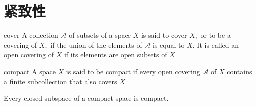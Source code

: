 \chapter{紧致性}
\begin{definition}{cover}
A collection $\mathcal{A}$ of subsets of a space $X$ is said to cover $X,$ or to be a covering of $X,$ if the union of the elements of $\mathcal{A}$ is equal to $X .$ It is called an open covering of $X$ if its elements are open subsets of $X$
\end{definition}
\begin{definition}{compact}
A space $X$ is said to be compact if every open covering $\mathcal{A}$ of $X$ contains a finite subcollection that also covers $X$
\end{definition}
\begin{theorem}
Every closed subspace of a compact space is compact.
\end{theorem}